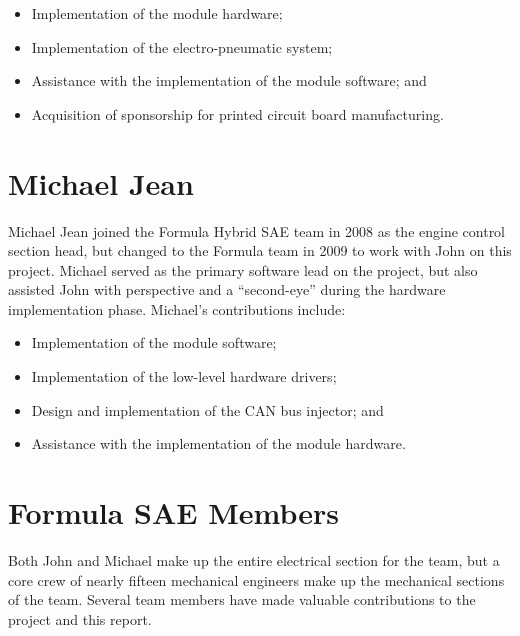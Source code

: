 \begin{itemize}

\item Implementation of the module hardware;
\item Implementation of the electro-pneumatic system;
\item Assistance with the implementation of the module software; and
\item Acquisition of sponsorship for printed circuit board manufacturing.

\end{itemize}

\section*{Michael Jean}

Michael Jean joined the Formula Hybrid SAE team in 2008 as the engine control section head, but changed to the Formula team in 2009 to work with John on this project. Michael served as the primary software lead on the project, but also assisted John with perspective and a {}``second-eye'' during the hardware implementation phase. Michael's contributions include:

\begin{itemize}

\item Implementation of the module software;
\item Implementation of the low-level hardware drivers;
\item Design and implementation of the CAN bus injector; and
\item Assistance with the implementation of the module hardware.

\end{itemize}

\section*{Formula SAE Members}

Both John and Michael make up the entire electrical section for the team, but a core crew of nearly fifteen mechanical engineers make up the mechanical sections of the team. Several team members have made valuable contributions to the project and this report.

